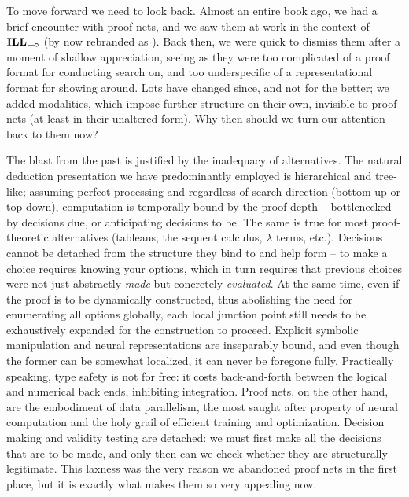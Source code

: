To move forward we need to look back.
Almost an entire book ago, we had a brief encounter with proof nets, and we saw them at work in the context of $\ILL_{\li}$ (by now rebranded as \NLP).
Back then, we were quick to dismiss them after a moment of shallow appreciation, seeing as they were too complicated of a proof format for conducting search on, and too underspecific of a representational format for showing around.
Lots have changed since, and not for the better; we added modalities, which impose further structure on their own, invisible to proof nets (at least in their unaltered form).
Why then should we turn our attention back to them now?

The blast from the past is justified by the inadequacy of alternatives.
The natural deduction presentation we have predominantly employed is hierarchical and tree-like; assuming perfect processing and regardless of search direction (bottom-up or top-down), computation is temporally bound by the proof depth -- bottlenecked by decisions due, or anticipating decisions to be.
The same is true for most proof-theoretic alternatives (tableaus, the sequent calculus, $\lambda$ terms, etc.).
Decisions cannot be detached from the structure they bind to and help form -- to make a choice requires knowing your options, which in turn requires that previous choices were not just abstractly \textit{made} but concretely \textit{evaluated}.
At the same time, even if the proof is to be dynamically constructed, thus abolishing the need for enumerating all options globally, each local junction point still needs to be exhaustively expanded for the construction to proceed.
Explicit symbolic manipulation and neural representations are inseparably bound, and even though the former can be somewhat localized, it can never be foregone fully.
Practically speaking, type safety is not for free: it costs back-and-forth between the logical and numerical back ends, inhibiting integration.
Proof nets, on the other hand, are the embodiment of data parallelism, the most saught after property of neural computation and the holy grail of efficient training and optimization.
Decision making and validity testing are detached: we must first make all the decisions that are to be made, and only then can we check whether they are structurally legitimate.
This laxness was the very reason we abandoned proof nets in the first place, but it is exactly what makes them so very appealing now.


